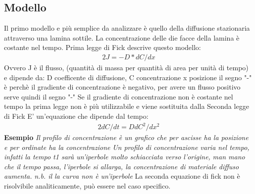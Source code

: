 \documentclass{article}%
\begin{document}
\subsection{ Modello }%
\label{subsec:Modello}%
Il primo modello e più semplice da analizzare è quello della diffusione stazionaria attraverso una lamina sottile.\newline%
%
La concentrazione delle die facce della lamina è costante nel tempo.\newline%
%
Prima legge di Fick descrive questo modello:\newline%
%
\begin{alignat}{2}%
J = -D * dC/dx
%
\end{alignat}%
Ovvero J è il flusso, (quantità di massa per quantità di area per unità di tempo) e dipende da:\newline%
%
D coefficente di diffusione,\newline%
%
C concentrazione\newline%
%
x posizione\newline%
%
il segno "{-}" è perchè il gradiente di concentrazione è negativo, per avere un flusso positivo serve quindi il segno "{-}"\newline%
%
\newline%
%
Se il gradiente di concentrazione non è costante nel tempo la prima legge non è più utilizzabile e viene sostituita dalla\newline%
%
Seconda legge di Fick\newline%
%
E' un'equazione che dipende dal tempo:\newline%
%
\begin{alignat}{2}%
dC/dt = D dC^2/dx^2
%
\end{alignat}%
\newline%
%
\textbf{ Esempio \newline%
}%
\textit{Il profilo di concentrazione è un grafico che per ascisse ha la posizione e per ordinate ha la concentrazione\newline%
}%
\textit{Un profilo di concentrazione varia nel tempo, infatti la tempo t1 sarà un'iperbole molto schiacciata verso l'origine,\newline%
}%
\textit{man mano che il tempo passa, l'iperbole si allarga, la concentrazione di materiale diffuso aumenta.\newline%
}%
\textit{n.b. il la curva non è un'iperbole\newline%
}%
\newline%
%
La seconda equazione di fick non è risolvibile analiticamente, può essere nel caso specifico.\newline%
\end{document}
